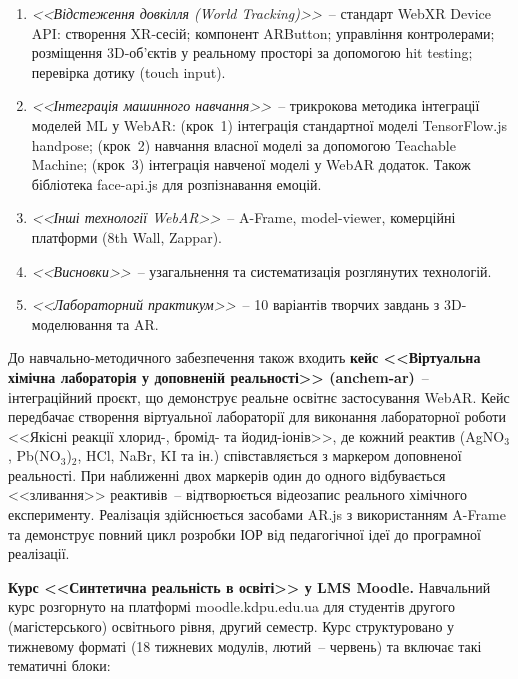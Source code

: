 \begin{enumerate}[label=\arabic*.]
\item \textit{<<Відстеження довкілля (World Tracking)>>}~-- стандарт WebXR Device API: створення XR-сесій; компонент ARButton; управління контролерами; розміщення 3D-об'єктів у реальному просторі за допомогою hit testing; перевірка дотику (touch input).

\item \textit{<<Інтеграція машинного навчання>>}~-- трикрокова методика інтеграції моделей ML у WebAR: (крок~1) інтеграція стандартної моделі TensorFlow.js handpose; (крок~2) навчання власної моделі за допомогою Teachable Machine; (крок~3) інтеграція навченої моделі у WebAR додаток. Також бібліотека face-api.js для розпізнавання емоцій.

\item \textit{<<Інші технології WebAR>>}~-- A-Frame, model-viewer, комерційні платформи (8th Wall, Zappar).

\item \textit{<<Висновки>>}~-- узагальнення та систематизація розглянутих технологій.

\item \textit{<<Лабораторний практикум>>}~-- 10 варіантів творчих завдань з 3D-моделювання та AR.
\end{enumerate}

До навчально-методичного забезпечення також входить \textbf{кейс <<Віртуальна хімічна лабораторія у доповненій реальності>> (anchem-ar)}~-- інтеграційний проєкт, що демонструє реальне освітнє застосування WebAR. Кейс передбачає створення віртуальної лабораторії для виконання лабораторної роботи <<Якісні реакції хлорид-, бромід- та йодид-іонів>>, де кожний реактив (AgNO$_3$, Pb(NO$_3$)$_2$, HCl, NaBr, KI та ін.) співставляється з маркером доповненої реальності. При наближенні двох маркерів один до одного відбувається <<зливання>> реактивів~-- відтворюється відеозапис реального хімічного експерименту. Реалізація здійснюється засобами AR.js з використанням A-Frame та демонструє повний цикл розробки ІОР від педагогічної ідеї до програмної реалізації.

\textbf{Курс <<Синтетична реальність в освіті>> у LMS Moodle.} Навчальний курс розгорнуто на платформі moodle.kdpu.edu.ua для студентів другого (магістерського) освітнього рівня, другий семестр. Курс структуровано у тижневому форматі (18 тижневих модулів, лютий~-- червень) та включає такі тематичні блоки:

